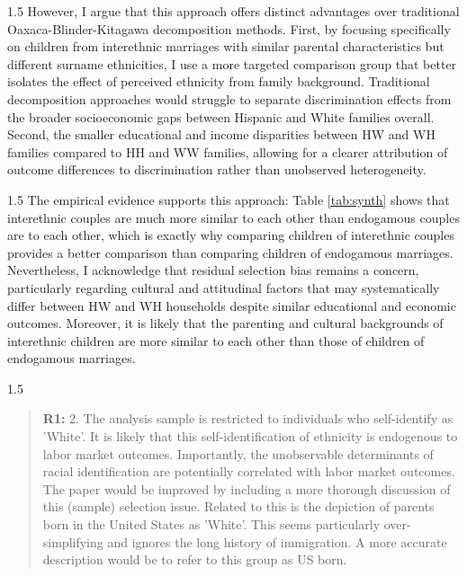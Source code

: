 \documentclass[12pt,english]{article}
\newcommand{\rrxspc}{1.5}
\begin{document}
\begin{refsection}
\begin{spacing}{\rrxspc}
    However, I argue that this approach offers distinct advantages over traditional Oaxaca-Blinder-Kitagawa decomposition methods. First, by focusing specifically on children from interethnic marriages with similar parental characteristics but different surname ethnicities, I use a more targeted comparison group that better isolates the effect of perceived ethnicity from family background. Traditional decomposition approaches would struggle to separate discrimination effects from the broader socioeconomic gaps between Hispanic and White families overall. Second, the smaller educational and income disparities between HW and WH families compared to HH and WW families, allowing for a clearer attribution of outcome differences to discrimination rather than unobserved heterogeneity. 
\end{spacing}

\begin{spacing}{\rrxspc}
    The empirical evidence supports this approach: Table \ref{tab:synth} shows that interethnic couples are much more similar to each other than endogamous couples are to each other, which is exactly why comparing children of interethnic couples provides a better comparison than comparing children of endogamous marriages. Nevertheless, I acknowledge that residual selection bias remains a concern, particularly regarding cultural and attitudinal factors that may systematically differ between HW and WH households despite similar educational and economic outcomes. Moreover, it is likely that the parenting and cultural backgrounds of interethnic children are more similar to each other than those of children of endogamous marriages.
    \end{spacing}

\begin{spacing}{\rrxspc}
\begin{quotation}
    \textbf{R1: } 2. The analysis sample is restricted to individuals who self-identify as 'White'. It is likely that this self-identification of ethnicity is endogenous to labor market outcomes. Importantly, the unobservable determinants of racial identification are potentially correlated with labor market outcomes. The paper would be improved by including a more thorough discussion of this (sample) selection issue. Related to this is the depiction of parents born in the United States as 'White'. This seems particularly over-simplifying and ignores the long history of immigration. A more accurate description would be to refer to this group as US born.
    \end{quotation}
    \end{spacing}
    

\end{refsection}
\end{document}
